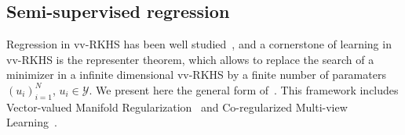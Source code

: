 \subsection{Semi-supervised regression}
Regression in \acl{vv-RKHS} has been well studied~\citep{Alvarez2012,
Minh_icml13,minh2016unifying,sangnier2016joint,kadri2015operator,Micchelli2005,
Brouard2016_jmlr}, and a cornerstone of learning in \acs{vv-RKHS} is the
representer theorem, which allows to replace the search of a minimizer in a infinite
dimensional \acs{vv-RKHS} by a finite number of paramaters $(u_i)_{i=1}^N$,
$u_i\in\mathcal{Y}$. We present here the general form
of~\citet{minh2016unifying}. This framework includes Vector-valued Manifold
Regularization~\citep{belkin2006manifold,Brouard2011,minh2013unifying} and
Co-regularized Multi-view
Learning~\citep{brefeld2006efficient,sindhwani2008rkhs,rosenberg2009kernel,
sun2011multi}.
